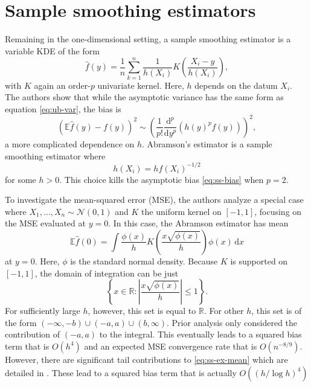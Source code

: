 \documentclass{article}
\newcommand{\E}{\mathbb{E}}
\newcommand{\R}{\mathbb{R}}
\newcommand{\abs}[1]{\left|#1\right|}
\newcommand{\dd}[1]{\,\text{d}#1}
\begin{document}
\section{Sample smoothing estimators}
Remaining in the one-dimensional setting, a sample smoothing estimator is a variable KDE of the form 
\begin{equation}\label{eq:ss1}
    \hat{f}(y) = \frac{1}{n} \sum_{k=1}^n \frac{1}{h(X_i)}K\left(\frac{X_i-y}{h(X_i)}\right), 
\end{equation}
with $K$ again an order-$p$ univariate kernel. Here, $h$ depends on the datum $X_i$. The authors show that while the asymptotic variance has the same form as equation \eqref{eq:ub-var}, the bias is 
\begin{equation}\label{eq:ss-bias}
    \left(\E \hat{f}(y) - f(y)\right)^2 \sim \left( \frac{1}{p!} \frac{\text{d}^p}{\text{d}y^p} \left(h(y)^pf(y)\right) \right)^2, 
\end{equation}
a more complicated dependence on $h$. Abramson's estimator is a sample smoothing estimator where 
\begin{equation}\label{eq:abr}
    h(X_i) = hf(X_i)^{-1/2}
\end{equation}
for some $h>0$. This choice kills the asymptotic bias \eqref{eq:ss-bias} when $p=2$. 

To investigate the mean-squared error (MSE), the authors analyze a special case where $X_1, \dots, X_n \sim \mathcal{N}(0,1)$ and $K$ the uniform kernel on $[-1,1]$, focusing on the MSE evaluated at $y=0$. In this case, the Abramson estimator has mean 
\begin{equation}\label{eq:ss-ex-mean}
    \E \hat{f}(0) = \int \frac{\phi(x)}{h} K\left(\frac{x\sqrt{\phi(x)}}{h}\right) \phi(x)\dd{x}
\end{equation}
at $y=0$. Here, $\phi$ is the standard normal density. Because $K$ is supported on $[-1,1]$, the domain of integration can be just 
\begin{equation}\label{eq:ss-ex-dom}
    \left\{x \in \R : \abs{\frac{x\sqrt{\phi(x)}}{h}} \leq 1\right\}.
\end{equation}
For sufficiently large $h$, however, this set is equal to $\R$. For other $h$, this set is of the form $(-\infty,-b) \cup (-a,a) \cup(b,\infty)$. Prior analysis only considered the contribution of $(-a,a)$ to the integral. This eventually leads to a squared bias term that is $O\left(h^4\right)$ and an expected MSE convergence rate that is $O\left(n^{-8/9}\right)$. However, there are significant tail contributions to \eqref{eq:ss-ex-mean} which are detailed in \cite{vkde}. These lead to a squared bias term that is actually $O\left(\left(h / \log h\right)^4\right)$
\end{document}
